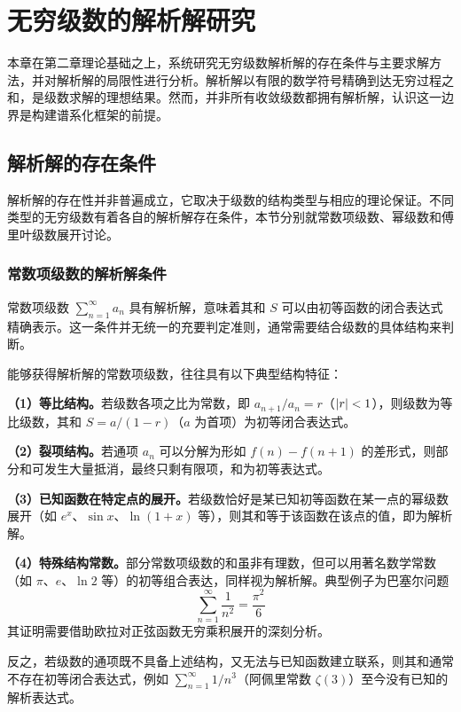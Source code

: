 
\chapter{无穷级数的解析解研究}

本章在第二章理论基础之上，系统研究无穷级数解析解的存在条件与主要求解方法，并对解析解的局限性进行分析。解析解以有限的数学符号精确到达无穷过程之和，是级数求解的理想结果。然而，并非所有收敛级数都拥有解析解，认识这一边界是构建谱系化框架的前提。

\section{解析解的存在条件}

解析解的存在性并非普遍成立，它取决于级数的结构类型与相应的理论保证。不同类型的无穷级数有着各自的解析解存在条件，本节分别就常数项级数、幂级数和傅里叶级数展开讨论。

\subsection{常数项级数的解析解条件}

常数项级数 $\displaystyle \sum_{n=1}^{\infty} a_n$ 具有解析解，意味着其和 $S$ 可以由初等函数的闭合表达式精确表示。这一条件并无统一的充要判定准则，通常需要结合级数的具体结构来判断。

能够获得解析解的常数项级数，往往具有以下典型结构特征：

\textbf{（1）等比结构。}若级数各项之比为常数，即 $a_{n+1}/a_n = r$（$\left|r\right| < 1$），则级数为等比级数，其和 $S = a/(1-r)$（$a$ 为首项）为初等闭合表达式。

\textbf{（2）裂项结构。}若通项 $a_n$ 可以分解为形如 $f(n) - f(n+1)$ 的差形式，则部分和可发生大量抵消，最终只剩有限项，和为初等表达式。

\textbf{（3）已知函数在特定点的展开。}若级数恰好是某已知初等函数在某一点的幂级数展开（如 $e^x$、$\sin x$、$\ln(1+x)$ 等），则其和等于该函数在该点的值，即为解析解。

\textbf{（4）特殊结构常数。}部分常数项级数的和虽非有理数，但可以用著名数学常数（如 $\pi$、$e$、$\ln 2$ 等）的初等组合表达，同样视为解析解。典型例子为巴塞尔问题
\begin{equation}
\sum_{n=1}^{\infty} \frac{1}{n^2} = \frac{\pi^2}{6}
\end{equation}
其证明需要借助欧拉对正弦函数无穷乘积展开的深刻分析。

反之，若级数的通项既不具备上述结构，又无法与已知函数建立联系，则其和通常不存在初等闭合表达式，例如 $\displaystyle \sum_{n=1}^{\infty} 1/n^3$（阿佩里常数 $\zeta(3)$）至今没有已知的解析表达式。

